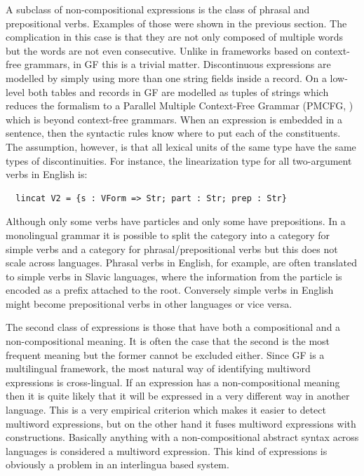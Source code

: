\documentclass[output=paper]{LSP/langsci}
\begin{document}
A subclass of non-compositional expressions is the class of phrasal and 
prepositional verbs. Examples of those were shown in 
the previous section. The complication in this case is that they are 
not only composed of multiple words but the words are not 
even consecutive. Unlike in frameworks based on context-free grammars, 
in GF this is a trivial matter. Discontinuous expressions 
are modelled by simply using more than one string fields inside a record.
On a low-level both tables and records in GF are modelled as 
tuples of strings which reduces the formalism to 
a Parallel Multiple Context-Free Grammar (PMCFG, \citealt{seki91:mcfg}) 
which is beyond context-free grammars. When an expression is embedded in 
a sentence, then the syntactic rules know where to put each of 
the constituents. The assumption, however, is that 
all lexical units of the same type have the same types of discontinuities. 
For instance, the linearization type for all two-argument verbs in English is:
\begin{verbatim}
  lincat V2 = {s : VForm => Str; part : Str; prep : Str}
\end{verbatim}
Although only some verbs have particles and only some have prepositions. In a monolingual grammar it is possible to split the category into a category for simple verbs and a category for phrasal/prepositional verbs but this does not scale across languages. Phrasal verbs in English, for example, are often translated to simple verbs in Slavic languages, where the information from the particle is encoded as a prefix attached to the root. Conversely simple verbs in English might become prepositional verbs in other languages or vice versa.

The second class of expressions is those that have both a compositional 
and a non-compositional meaning. It is often the case that the second is 
the most frequent meaning but the former cannot be excluded either. 
Since GF is a multilingual framework, the most natural way of 
identifying multiword expressions is cross-lingual. If an expression 
has a non-compositional meaning then it is quite likely that 
it will be expressed in a very different way in another language. 
This is a very empirical criterion which makes it easier to detect 
multiword expressions, but on the other hand it fuses 
multiword expressions with constructions. Basically anything with 
a non-compositional abstract syntax across languages is considered 
a multiword expression. This kind of expressions is obviously a problem 
in an interlingua based system.
\end{document}
